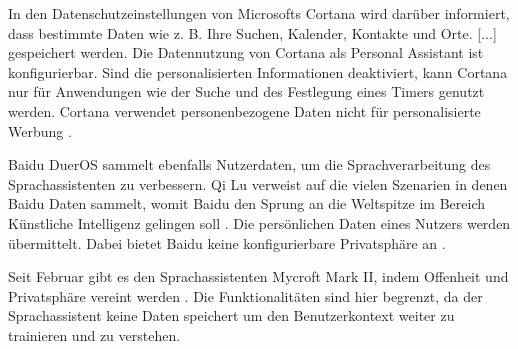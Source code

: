 In den Datenschutzeinstellungen von Microsofts Cortana wird darüber informiert, dass bestimmte Daten \glqq [...] wie z. B. Ihre Suchen, Kalender, Kontakte und Orte. [...]\grqq{} gespeichert werden. Die Datennutzung von Cortana als Personal Assistant ist konfigurierbar. Sind die personalisierten Informationen deaktiviert, kann Cortana nur für Anwendungen wie der Suche und des Festlegung eines Timers genutzt werden. Cortana verwendet personenbezogene Daten nicht für personalisierte Werbung \cite{cortanaAssistent}. 

Baidu DuerOS sammelt ebenfalls Nutzerdaten, um die Sprachverarbeitung des Sprachassistenten zu verbessern. Qi Lu verweist auf die vielen Szenarien in denen Baidu Daten sammelt, womit Baidu den Sprung an die Weltspitze im Bereich Künstliche Intelligenz gelingen soll . Die persönlichen Daten eines Nutzers werden übermittelt. Dabei bietet Baidu keine konfigurierbare Privatsphäre an \cite{baiduAI}. 

Seit Februar gibt es den Sprachassistenten Mycroft Mark II, indem Offenheit und Privatsphäre vereint werden \cite{mycroftsmartspeaker}. Die Funktionalitäten sind hier begrenzt, da der Sprachassistent keine Daten speichert um den Benutzerkontext weiter zu trainieren und zu verstehen.